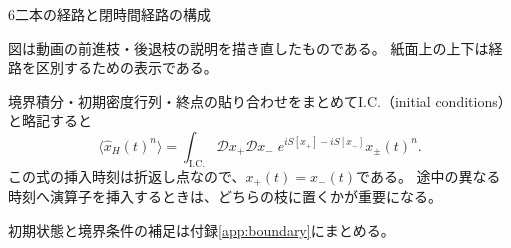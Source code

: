\documentclass[a4paper,11pt]{ltjsarticle}
\numberwithin{equation}{section}
\newcommand{\av}[1]{\langle #1\rangle}
\begin{document}
\begin{lecturesection}{6}{二本の経路と閉時間経路の構成}
\begin{center}
\end{center}
図は動画の前進枝・後退枝の説明を描き直したものである。
紙面上の上下は経路を区別するための表示である。

境界積分・初期密度行列・終点の貼り合わせをまとめてI.C.（initial conditions）と略記すると
\begin{equation}
 \av{\hat x_H(t)^n}
 =\int_{\mathrm{I.C.}}\mathcal D x_+\mathcal D x_-\;
   e^{iS[x_+]-iS[x_-]}x_\pm(t)^n.
\end{equation}
この式の挿入時刻は折返し点なので、$x_+(t)=x_-(t)$である。
途中の異なる時刻へ演算子を挿入するときは、どちらの枝に置くかが重要になる。

\par\noindent 初期状態と境界条件の補足は付録\ref{app:boundary}にまとめる。

\end{lecturesection}
\end{document}
